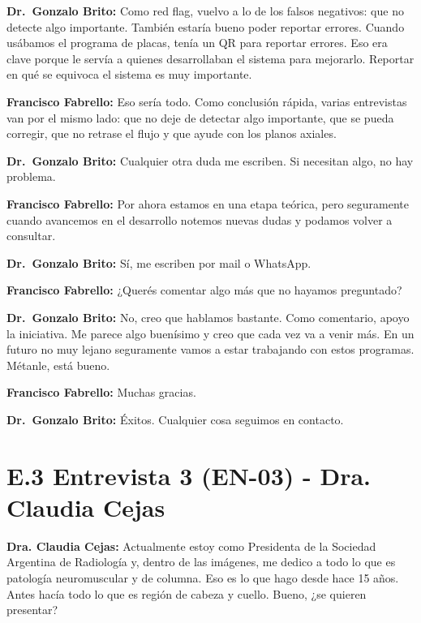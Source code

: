 \noindent\textbf{Dr.~Gonzalo Brito:} Como red flag, vuelvo a lo de los falsos negativos: que no detecte algo importante. También estaría bueno poder reportar errores. Cuando usábamos el programa de placas, tenía un QR para reportar errores. Eso era clave porque le servía a quienes desarrollaban el sistema para mejorarlo. Reportar en qué se equivoca el sistema es muy importante.

\noindent\textbf{Francisco Fabrello:} Eso sería todo. Como conclusión rápida, varias entrevistas van por el mismo lado: que no deje de detectar algo importante, que se pueda corregir, que no retrase el flujo y que ayude con los planos axiales.

\noindent\textbf{Dr.~Gonzalo Brito:} Cualquier otra duda me escriben. Si necesitan algo, no hay problema.

\noindent\textbf{Francisco Fabrello:} Por ahora estamos en una etapa teórica, pero seguramente cuando avancemos en el desarrollo notemos nuevas dudas y podamos volver a consultar.

\noindent\textbf{Dr.~Gonzalo Brito:} Sí, me escriben por mail o WhatsApp.

\noindent\textbf{Francisco Fabrello:} ¿Querés comentar algo más que no hayamos preguntado?

\noindent\textbf{Dr.~Gonzalo Brito:} No, creo que hablamos bastante. Como comentario, apoyo la iniciativa. Me parece algo buenísimo y creo que cada vez va a venir más. En un futuro no muy lejano seguramente vamos a estar trabajando con estos programas. Métanle, está bueno.

\noindent\textbf{Francisco Fabrello:} Muchas gracias.

\noindent\textbf{Dr.~Gonzalo Brito:} Éxitos. Cualquier cosa seguimos en contacto.
\section*{E.3 Entrevista 3 (EN-03) - Dra. Claudia Cejas}
\label{anexo:entrevista-en03}

\noindent\textbf{Dra. Claudia Cejas:} Actualmente estoy como Presidenta de la Sociedad Argentina de Radiología y, dentro de las imágenes, me dedico a todo lo que es patología neuromuscular y de columna. Eso es lo que hago desde hace 15 años. Antes hacía todo lo que es región de cabeza y cuello. Bueno, ¿se quieren presentar?

